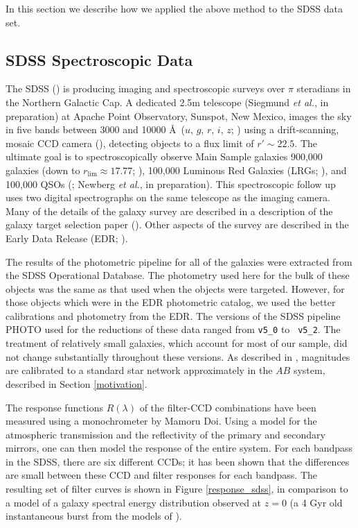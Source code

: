 \documentclass[10pt,preprint]{aastex}
\begin{document}
In this section we describe how we applied the above method to the
SDSS data set.

\subsection{SDSS Spectroscopic Data}

The SDSS (\citealt{york00a}) is producing imaging and spectroscopic
surveys over $\pi$ steradians in the Northern Galactic Cap. A
dedicated 2.5m telescope (Siegmund {\it et al.}, in preparation) at
Apache Point Observatory, Sunspot, New Mexico, images the sky in five
bands between 3000 and 10000 \AA\ ($u$, $g$, $r$, $i$, $z$;
\citealt{fukugita96a}) using a drift-scanning, mosaic CCD camera
(\citealt{gunn98a}), detecting objects to a flux limit of $r'\sim
22.5$. The ultimate goal is to spectroscopically observe Main Sample
galaxies 900,000 galaxies (down to $r_{\mathrm{lim}}\approx 17.77$;
\citealt{strauss02a}), 100,000 Luminous Red Galaxies (LRGs;
\citealt{eisenstein01a}), and 100,000 QSOs (\citealt{fan99a}; Newberg
{\it et al.}, in preparation).  This spectroscopic follow up uses two
digital spectrographs on the same telescope as the imaging
camera. Many of the details of the galaxy survey are described in a
description of the galaxy target selection paper
(\citealt{strauss02a}). Other aspects of the survey are described in
the Early Data Release (EDR; \citealt{stoughton02a}).

The results of the photometric pipeline for all of the galaxies were
extracted from the SDSS Operational Database. The photometry used here
for the bulk of these objects was the same as that used when the
objects were targeted. However, for those objects which were in the
EDR photometric catalog, we used the better calibrations and
photometry from the EDR. The versions of the SDSS pipeline PHOTO used
for the reductions of these data ranged from {\tt v5\_0} to {\tt
v5\_2}. The treatment of relatively small galaxies, which account for
most of our sample, did not change substantially throughout these
versions. As described in \citet{smith02a}, magnitudes are calibrated to a
standard star network approximately in the $AB$ system, described in
Section \ref{motivation}.

The response functions $R(\lambda)$ of the filter-CCD combinations
have been measured using a monochrometer by Mamoru Doi.  Using a model
for the atmospheric transmission and the reflectivity of the primary
and secondary mirrors, one can then model the response of the entire
system. For each bandpass in the SDSS, there are six different CCDs;
it has been shown that the differences are small between these CCD and
filter responses for each bandpass.  The resulting set of filter
curves is shown in Figure \ref{response_sdss}, in comparison to a
model of a galaxy spectral energy distribution observed at $z=0$ (a 4
Gyr old instantaneous burst from the models of \citealt{bruzual93a}).
\end{document}
